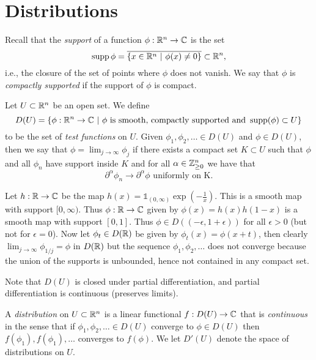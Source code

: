 \documentclass[twoside, a4paper, 10pt]{amsart}
\begin{document}
\section{Distributions}

Recall that the \textit{support} of a function $\phi:\mathbb{R}^n \to \mathbb{C}$ is the set $$\operatorname{supp} \phi = \overline{\{x \in \mathbb{R}^n ~|~ \phi(x) \neq 0 \}} \subset \mathbb{R}^n,$$ i.e., the closure of the set of points where $\phi$ does not vanish. We say that $\phi$ is \textit{compactly supported} if the support of $\phi$ is compact.

\begin{mydef} Let $U \subset \mathbb{R}^n$ be an open set. We define $$D(U) = \{ \phi :\mathbb{R}^n \to \mathbb{C} ~|~ \phi \text{ is smooth, compactly supported and } \operatorname{supp}(\phi) \subset U  \}$$ to be the set of \textit{test functions} on $U$. Given $\phi_1,\phi_2, \ldots \in D(U)$ and $\phi \in D(U)$, then we say that $\phi = \lim_{j \to \infty} \phi_j$ if there exists a compact set $K \subset U$ such that $\phi$ and all $\phi_n$ have support inside $K$ and for all $\alpha \in \mathbb{Z}_{\geq 0}^n$ we have that $$\partial^{\alpha} \phi_n \to \partial^{\alpha} \phi \text{ uniformly on K.}$$ 

\end{mydef}

	\begin{eg} Let $h:\mathbb{R} \to \mathbb{C}$ be the map $h(x) = \mathds{1}_{(0,\infty)} \exp(-\frac{1}{x})$. This is a smooth map with support $[0, \infty)$. Thus $\phi:\mathbb{R} \to \mathbb{C}$ given by $\phi(x) = h(x)h(1-x)$ is a smooth map with support $[0,1]$. Thus $\phi \in D((-\epsilon, 1 + \epsilon))$ for all $\epsilon >0$ (but not for $\epsilon = 0$). Now let $\phi_t \in D(\mathbb{R})$ be given by $\phi_t(x) = \phi(x+t)$, then clearly $\lim_{j \to \infty} \phi_{1/j} = \phi$ in $D(\mathbb{R})$ but the sequence $\phi_1,\phi_2,\ldots$ does not converge because the union of the supports is unbounded, hence not contained in any compact set.
\end{eg}

Note that $D(U)$ is closed under partial differentiation, and partial differentiation is continuous (preserves limits).

\begin{mydef} A \textit{distribution} on $U \subset \mathbb{R}^n$ is a linear functional $f:D(U) \to \mathbb{C}$ that is \textit{continuous} in the sense that if $\phi_1, \phi_2,\ldots \in D(U)$ converge to $\phi \in D(U)$ then $f(\phi_1), f(\phi_1), \ldots$ converges to $f(\phi)$. We let $D'(U)$ denote the space of distributions on $U$. 

\end{mydef}
\end{document}
